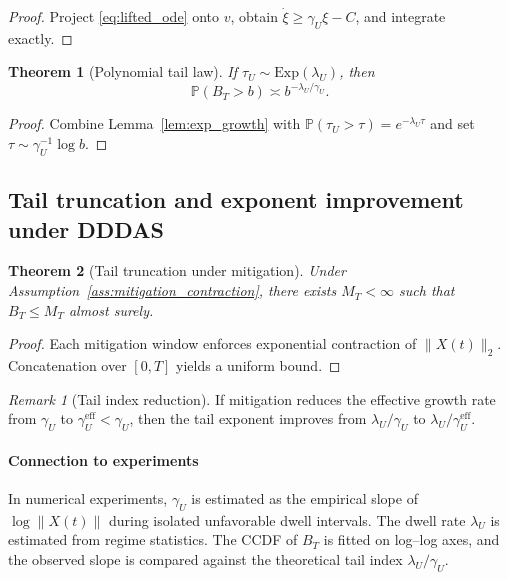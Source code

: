 \documentclass[12pt,a4paper]{article}
\newtheorem{theorem}{Theorem}
\theoremstyle{definition}
\theoremstyle{remark}
\newtheorem{remark}{Remark}
\begin{document}
\begin{proof}
	Project \eqref{eq:lifted_ode} onto $v$, obtain
	$\dot \xi \ge \gamma_U \xi - C$, and integrate exactly.
\end{proof}

\begin{theorem}[Polynomial tail law]
	\label{thm:tail}
	If $\tau_U\sim \mathrm{Exp}(\lambda_U)$, then
	\[
	\mathbb P(B_T>b) \asymp b^{-\lambda_U/\gamma_U}.
	\]
\end{theorem}

\begin{proof}
	Combine Lemma~\ref{lem:exp_growth} with
	$\mathbb P(\tau_U>\tau)=e^{-\lambda_U\tau}$ and set
	$\tau\sim \gamma_U^{-1}\log b$.
\end{proof}
\subsection{Tail truncation and exponent improvement under DDDAS}
\label{subsec:dddas_results}

\begin{theorem}[Tail truncation under mitigation]
	\label{thm:dddas}
	Under Assumption~\ref{ass:mitigation_contraction}, there exists $M_T<\infty$ such
	that $B_T\le M_T$ almost surely.
\end{theorem}

\begin{proof}
	Each mitigation window enforces exponential contraction of $\|X(t)\|_2$.
	Concatenation over $[0,T]$ yields a uniform bound.
\end{proof}

\begin{remark}[Tail index reduction]
	If mitigation reduces the effective growth rate from $\gamma_U$ to
	$\gamma_U^{\mathrm{eff}}<\gamma_U$, then the tail exponent improves from
	$\lambda_U/\gamma_U$ to $\lambda_U/\gamma_U^{\mathrm{eff}}$.
\end{remark}


\paragraph{Connection to experiments}
In numerical experiments, $\gamma_U$ is estimated as the empirical slope of
$\log \|X(t)\|$ during isolated unfavorable dwell intervals. The dwell rate
$\lambda_U$ is estimated from regime statistics. The CCDF of $B_T$ is fitted on
log--log axes, and the observed slope is compared against the theoretical tail
index $\lambda_U/\gamma_U$.
\end{document}

